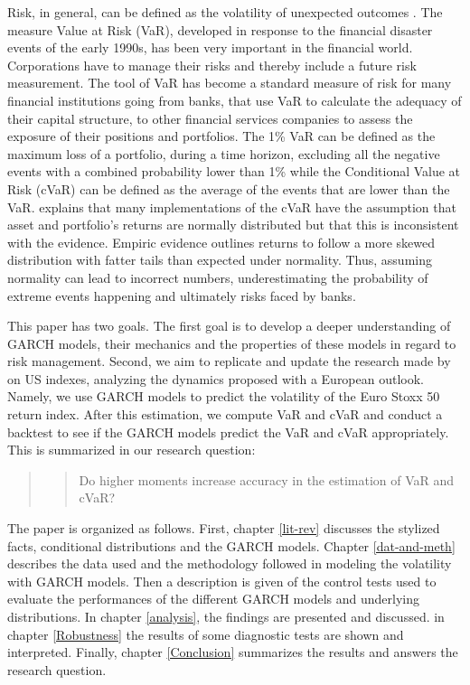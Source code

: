 \documentclass[a4paper, twoside]{templates/ociamthesis}
\begin{document}
Risk, in general, can be defined as the volatility of unexpected outcomes \autocite{jorion2007}. The measure Value at Risk (VaR), developed in response to the financial disaster events of the early 1990s, has been very important in the financial world. Corporations have to manage their risks and thereby include a future risk measurement. The tool of VaR has become a standard measure of risk for many financial institutions going from banks, that use VaR to calculate the adequacy of their capital structure, to other financial services companies to assess the exposure of their positions and portfolios. The 1\% VaR can be defined as the maximum loss of a portfolio, during a time horizon, excluding all the negative events with a combined probability lower than 1\% while the Conditional Value at Risk (cVaR) can be defined as the average of the events that are lower than the VaR. \textcite{bali2008} explains that many implementations of the cVaR have the assumption that asset and portfolio's returns are normally distributed but that this is inconsistent with the evidence. Empiric evidence outlines returns to follow a more skewed distribution with fatter tails than expected under normality. Thus, assuming normality can lead to incorrect numbers, underestimating the probability of extreme events happening and ultimately risks faced by banks.

\noindent This paper has two goals. The first goal is to develop a deeper understanding of GARCH models, their mechanics and the properties of these models in regard to risk management. Second, we aim to replicate and update the research made by \textcite{bali2008} on US indexes, analyzing the dynamics proposed with a European outlook. Namely, we use GARCH models to predict the volatility of the Euro Stoxx 50 return index. After this estimation, we compute VaR and cVaR and conduct a backtest to see if the GARCH models predict the VaR and cVaR appropriately. This is summarized in our research question:

\begin{quote}
\begin{quote}
Do higher moments increase accuracy in the estimation of VaR and cVaR?
\end{quote}
\end{quote}

\noindent The paper is organized as follows. First, chapter \ref{lit-rev} discusses the stylized facts, conditional distributions and the GARCH models. Chapter \ref{dat-and-meth} describes the data used and the methodology followed in modeling the volatility with GARCH models. Then a description is given of the control tests used to evaluate the performances of the different GARCH models and underlying distributions. In chapter \ref{analysis}, the findings are presented and discussed. in chapter \ref{Robustness} the results of some diagnostic tests are shown and interpreted. Finally, chapter \ref{Conclusion} summarizes the results and answers the research question.
\end{document}
